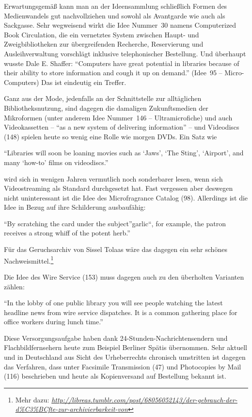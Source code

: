 \documentclass[a4paper,
fontsize=11pt,
oneside,
numbers=noperiodatend,
parskip=half-,
bibliography=totoc,
final
]{scrartcl}
\begin{document}
Erwartungsgemäß kann man an der Ideensammlung schließlich Formen des
Medienwandels gut nachvollziehen und sowohl als Avantgarde wie auch als
Sackgasse. Sehr wegweisend wirkt die Idee Nummer~30 namens Computerized
Book Circulation, die ein vernetztes System zwischen Haupt- und
Zweigbibliotheken zur übergreifenden Recherche, Reservierung und
Ausleihverwaltung vorschlägt inklusive telephonischer Bestellung. Und
überhaupt wusste Dale E. Shaffer: \enquote{Computers have great
potential in libraries because of their ability to store information and
cough it up on demand.} (Idee~95 -- Micro-Computers) Das ist eindeutig
ein Treffer.

Ganz aus der Mode, jedenfalls an der Schnittstelle zur alltäglichen
Bibliotheksnutzung, sind dagegen die damaligen Zukunftsmedien der
Mikroformen (unter anderem Idee Nummer~146 -- Ultramicrofiche) und auch
Videokassetten -- \enquote{as a new system of delivering information} --
und Videodiscs (148) spielen heute so wenig eine Rolle wie morgen DVDs.
Ein Satz wie

\enquote{Libraries will soon be loaning movies such as \enquote{Jaws},
\enquote{The Sting}, \enquote{Airport}, and many \enquote{how-to} films
on videodiscs.}

wird sich in wenigen Jahren vermutlich noch sonderbarer lesen, wenn sich
Videostreaming als Standard durchgesetzt hat. Fast vergessen aber
deswegen nicht uninteressant ist die Idee des Microfragrance Catalog
(98). Allerdings ist die Idee in Bezug auf ihre Schilderung ausbaufähig:

\enquote{By scratching the card under the subject}garlic\enquote{, for
example, the patron receives a strong whiff of the potent herb.}

Für das Geruchsarchiv von Sissel Tolaas wäre das dagegen ein sehr
schönes Nachweismittel.\footnote{Mehr dazu:
  \href{http://libreas.tumblr.com/post/68056052143/der-gebrauch-der-d\%C3\%BCfte-zur-archivierbarkeit-von}{\emph{http://libreas.tumblr.com/post/68056052143/der-gebrauch-der-d\%C3\%BCfte-zur-archivierbarkeit-von}}}

Die Idee des Wire Service (153) muss dagegen auch zu den überholten
Varianten zählen:

\enquote{In the lobby of one public library you will see people watching
the latest headline news from wire service dispatches. It is a common
gathering place for office workers during lunch time.}

Diese Versorgungsaufgabe haben dank 24-Stunden-Nachrichtensendern und
Flachbildfernsehern heute zum Beispiel Berliner Spätis übernommen. Sehr
aktuell und in Deutschland aus Sicht des Urheberrechts chronisch
umstritten ist dagegen das Verfahren, dass unter Facsimile Transmission
(47) und Photocopies by Mail (116) beschrieben und heute als
Kopienversand auf Bestellung bekannt ist.
\end{document}
